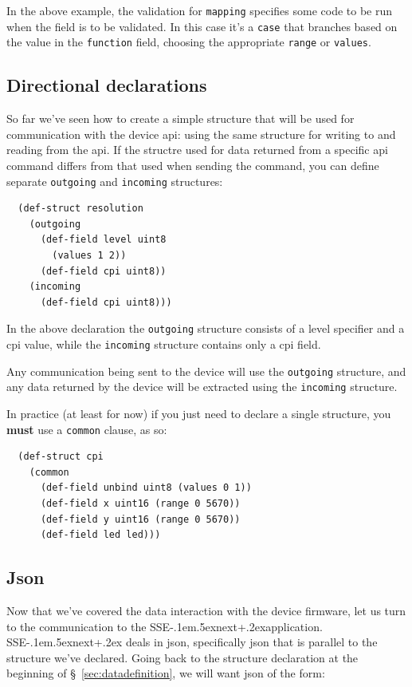 \documentclass[12pt]{article}
\def\SSEnext{SSE\kern-.1em\lower.5ex\hbox{\footnotesize next}\kern+.2ex}
\begin{document}
In the above example, the validation for \verb|mapping| specifies some
code to be run when the field is to be validated. In this case it's a
\verb|case| that branches based on the value in the \verb|function| field,
choosing the appropriate \verb|range| or \verb|values|.

\subsection{Directional declarations}

So far we've seen how to create a simple structure that will be used
for communication with the device api: using the same structure for
writing to and reading from the api. If the structre used for data returned from a
specific api command differs from that used when sending the command,
you can define separate \verb|outgoing| and \verb|incoming| structures:

\begin{verbatim}
  (def-struct resolution
    (outgoing
      (def-field level uint8
        (values 1 2))
      (def-field cpi uint8))
    (incoming
      (def-field cpi uint8)))
\end{verbatim}

In the above declaration the \verb|outgoing| structure consists of a
level specifier and a cpi value, while the \verb|incoming| structure
contains only a cpi field.

Any communication being sent to the device will use the
\verb|outgoing| structure, and any data returned by the device will
be extracted using the \verb|incoming| structure.

In practice (at least for now) if you just need to declare a single
structure, you {\bf must} use a \verb|common| clause, as so:

\begin{verbatim}
  (def-struct cpi
    (common
      (def-field unbind uint8 (values 0 1))
      (def-field x uint16 (range 0 5670))
      (def-field y uint16 (range 0 5670))
      (def-field led led)))
\end{verbatim}

\subsection{Json}

Now that we've covered the data interaction with the device firmware,
let us turn to the communication to the \SSEnext application. \SSEnext
deals in json, specifically json that is parallel to the structure we've
declared. Going back to the structure declaration at the beginning of
\S~\ref{sec:datadefinition}, we will want json of the form:
\end{document}
